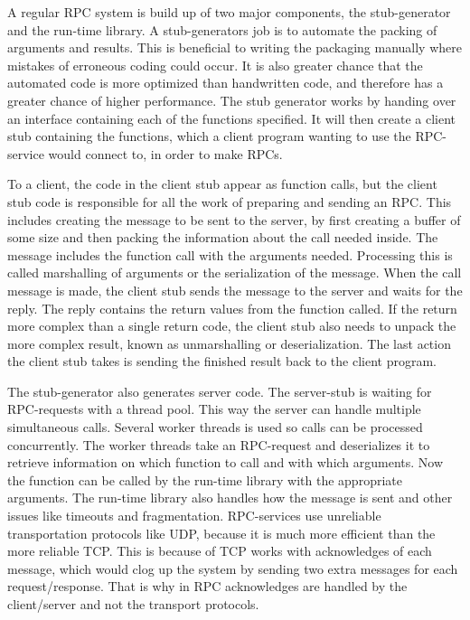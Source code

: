 \documentclass[11pt]{article}
\begin{document}
A regular RPC system is build up of two major components, the stub-generator and the run-time library\cite{rpc}. A stub-generators job is to automate the packing of arguments and results. This is beneficial to writing the packaging manually where mistakes of erroneous coding could occur. It is also greater chance that the automated code is more optimized than handwritten code, and therefore has a greater chance of higher performance. The stub generator works by handing over an interface containing each of the functions specified. It will then create a client stub containing the functions, which a client program wanting to use the RPC-service would connect to, in order to make RPCs. 

To a client, the code in the client stub appear as function calls, but the client stub code is responsible for all the work of preparing and sending an RPC. This includes creating the message to be sent to the server, by first creating a buffer of some size and then packing the information about the call needed inside. The message includes the function call with the arguments needed. Processing this is called marshalling of arguments or the serialization of the message. When the call message is made, the client stub sends the message to the server and waits for the reply. The reply contains the return values from the function called. If the return more complex than a single return code, the client stub also needs to unpack the more complex result, known as unmarshalling or deserialization. The last action the client stub takes is sending the finished result back to the client program. 

The stub-generator also generates server code. The server-stub is waiting for RPC-requests with a thread pool. This way the server can handle multiple simultaneous calls. Several worker threads is used so calls can be processed concurrently. The worker threads take an RPC-request and deserializes it to retrieve information on which function to call and with which arguments. Now the function can be called by the run-time library with the appropriate arguments. The run-time library also handles how the message is sent and other issues like timeouts and fragmentation. RPC-services use unreliable transportation protocols like UDP, because it is much more efficient than the more reliable TCP. This is because of TCP works with acknowledges of each message, which would clog up the system by sending two extra messages for each request/response. That is why in RPC acknowledges are handled by the client/server and not the transport protocols. 
\end{document}
